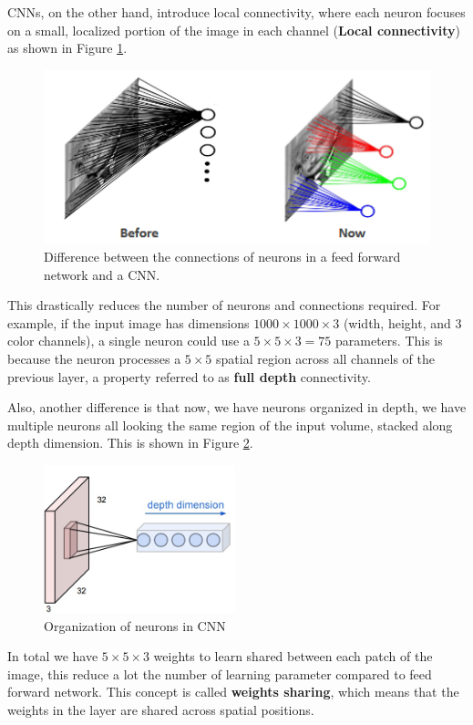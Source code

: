 CNNs, on the other hand, introduce local connectivity, where each neuron focuses
on a small, localized portion of the image in each channel (\textbf{Local
    connectivity}) as shown in Figure \ref{fig:localConn}.

\begin{figure}[!ht]
    \centering
    \includegraphics[width=0.45\linewidth]{img/CNN/localConn.png}
    \caption{Difference between the connections of neurons in a feed forward
        network and a CNN.}
    \label{fig:localConn}
\end{figure}

This drastically reduces the number of neurons and connections required. For
example, if the input image has dimensions $1000 \times 1000 \times 3$ (width,
height, and 3 color channels), a single neuron could use a $5 \times 5 \times 3 = 75$
parameters. This is because the neuron processes a $5 \times 5$ spatial region
across all channels of the previous layer, a property referred to as \textbf{full
    depth} connectivity.

Also, another difference is that now, we have neurons organized in depth, we have
multiple neurons all looking the same region of the input volume, stacked along depth
dimension. This is shown in Figure \ref{fig:depth}.

\begin{figure}[!ht]
    \centering
    \includegraphics[width=0.25\linewidth]{img/CNN/depth.png}
    \caption{Organization of neurons in CNN}
    \label{fig:depth}
\end{figure}

In total we have $5\times 5\times 3$ weights to learn shared between each patch
of the image, this reduce a lot the number of learning parameter compared to
feed forward network. This concept is called \textbf{weights sharing}, which means
that the weights in the layer are shared across spatial positions.


